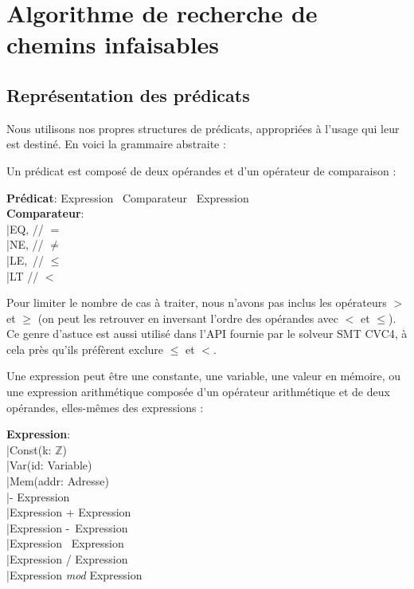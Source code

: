 \documentclass[french]{article}
\newcommand\ccc[1]{\color{red}{#1}\color{black}} %
\begin{document}
  \section{Algorithme de recherche de chemins infaisables}
  \ccc{Nous allons maintenant examiner le fonctionnement de l'algorithme d'analyse, et les structures de données qu'il manipule.}
  
  \subsection{Représentation des prédicats}
  Nous utilisons nos propres structures de prédicats, appropriées à l'usage qui leur est destiné. En voici la grammaire abstraite :

  Un prédicat est composé de deux opérandes et d'un opérateur de comparaison :

  \begin{algorithm}[H]
    \textbf{Prédicat}: Expression \texttimes~Comparateur \texttimes~Expression\\
        \textbf{Comparateur}:\\
            \qquad |\quad EQ, // $=$\\
            \qquad |\quad NE, // $\neq$\\
            \qquad |\quad LE,\, // $\leq$\\
            \qquad |\quad LT\: // $<$\\
  \end{algorithm}

  Pour limiter le nombre de cas à traiter, nous n'avons pas inclus les opérateurs $>$ et $\geq$ (on peut les retrouver en inversant l'ordre des opérandes avec $<$ et $\leq$). Ce genre d'astuce est aussi utilisé dans l'API fournie par le solveur SMT CVC4, à cela près qu'ils préfèrent exclure $\leq$ et $<$.

  Une expression peut être une constante, une variable, une valeur en mémoire, ou une expression arithmétique composée d'un opérateur arithmétique et de deux opérandes, elles-mêmes des expressions :

  \begin{algorithm}[H]
        \textbf{Expression}:\\
            \qquad |\quad Const(k: $\mathds{Z}$)\\
            \qquad |\quad Var(id: Variable)\\
            \qquad |\quad Mem(addr: Adresse)\\
            \qquad |\quad \-- Expression\\
            \qquad |\quad Expression + Expression\\
            \qquad |\quad Expression \--\ Expression\\
            \qquad |\quad Expression \texttimes\ Expression\\
            \qquad |\quad Expression / Expression\\
            \qquad |\quad Expression \textit{mod} Expression\\
  \end{algorithm}
\end{document}

